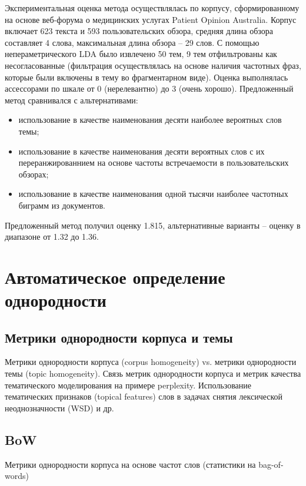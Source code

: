 Экспериментальная оценка метода осуществлялась по корпусу, сформированному на основе веб-форума о медицинских услугах Patient Opinion Australia. Корпус включает 623 текста и 593 пользовательских обзора, средняя длина обзора составляет 4 слова, максимальная длина обзора -- 29 слов. С помощью непераметрического LDA было извлечено 50 тем, 9 тем отфильтрованы как несогласованные (фильтрация осуществлялась на основе наличия частотных фраз, которые были включены в тему во фрагментарном виде). Оценка выполнялась ассессорами по шкале от 0 (нерелевантно) до 3 (очень хорошо). Предложенный метод сравнивался с альтернативами: 
\begin{itemize}
    \item использование в качестве наименования десяти наиболее вероятных слов темы;
    \item использование в качестве наименования десяти вероятных слов с их переранжированнием на основе частоты встречаемости в пользовательских обзорах;
    \item использование в качестве наименования одной тысячи наиболее частотных биграмм из документов.
\end{itemize} 
\noindent Предложенный метод получил оценку 1.815, альтернативные варианты -- оценку в диапазоне от 1.32 до 1.36.

 






\chapter{Автоматическое определение однородности}

\section{Метрики однородности корпуса и темы}

Метрики однородности корпуса (corpus homogeneity) vs. метрики однородности темы (topic homogeneity). Связь метрик однородности корпуса и метрик качества тематического моделирования на примере perplexity. Использование тематических признаков (topical features) слов в задачах снятия лексической неоднозначности (WSD) и др.

\section{BoW}

Метрики однородности корпуса на основе частот слов (статистики на bag-of-words)

